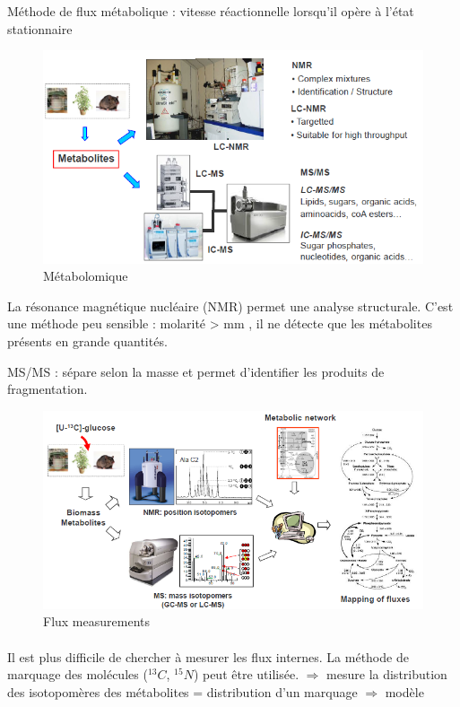 \noindent Méthode de flux métabolique : vitesse réactionnelle lorsqu'il opère à l'état stationnaire

\begin{figure}[!h]
    \centering
    \includegraphics{Images/8.PNG}
    \caption{Métabolomique}
\end{figure}

\noindent La résonance magnétique nucléaire (NMR) permet une analyse structurale. C'est une méthode peu sensible : molarité > mm , il ne détecte que les métabolites présents en grande quantités.  

\noindent MS/MS : sépare selon la masse et permet d'identifier les produits de fragmentation.

\begin{figure}
    \centering
    \includegraphics{Images/9.PNG}
    \caption{Flux measurements}
\end{figure}


\paragraph{}Il est plus difficile de chercher à mesurer les flux internes. La méthode de marquage des molécules ($^{13}C$, $^{15}N$) peut être utilisée. $\Rightarrow$ mesure la distribution des isotopomères des métabolites = distribution d'un marquage $\Rightarrow$ modèle

